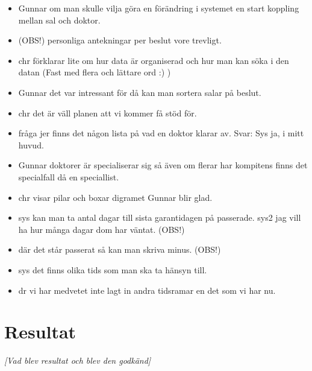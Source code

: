 \documentclass[a4paper,10pt, twoside]{article}
\begin{document}
\begin{itemize}
    \item Gunnar om man skulle vilja göra en förändring i systemet en start koppling mellan sal och doktor.
    \item (OBS!) personliga antekningar per beslut vore trevligt.
    \item chr förklarar lite om hur data är organiserad och hur man kan söka i den datan (Fast med flera och lättare ord :) )
    \item Gunnar det var intressant för då kan man sortera salar på beslut.
    \item chr det är väll planen att vi kommer få stöd för.
    \item fråga jer finns det någon lista på vad en doktor klarar av. Svar: Sys ja, i mitt huvud.
    \item Gunnar doktorer är specialiserar sig så även om flerar har kompitens finns det specialfall då en speciallist.
    \item chr visar pilar och boxar digramet Gunnar blir glad.
    \item sys kan man ta antal dagar till sista garantidagen på passerade. sys2 jag vill ha hur många dagar dom har väntat. (OBS!)
    \item där det står passerat så kan man skriva minus. (OBS!)
    \item sys det finns olika tids som man ska ta hänsyn till.
    \item dr vi har medvetet inte lagt in andra tidsramar en det som vi har nu.
\end{itemize}

\section{Resultat}
\emph{[Vad blev resultat och blev den godkänd]}
\end{document}
